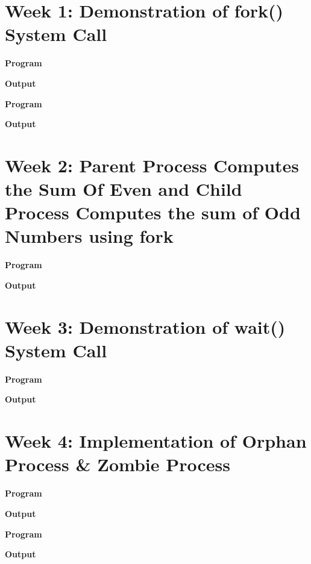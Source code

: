 \documentclass{article}
\begin{document}
\tableofcontents

\newpage

\section{Week 1: Demonstration of fork() System Call}

\noindent \textbf{\large{Program}}


\newpage
\noindent \textbf{\large{Output}}


\newpage
\noindent \textbf{\large{Program}}


\newpage
\noindent \textbf{\large{Output}}


\newpage
\section{Week 2: Parent Process Computes the Sum Of Even and Child Process Computes the sum of Odd Numbers using fork}

\noindent \textbf{\large{Program}}


\newpage
\noindent \textbf{\large{Output}}


\newpage
\section{Week 3: Demonstration of wait() System Call}

\noindent \textbf{\large{Program}}


\newpage
\noindent \textbf{\large{Output}}


\newpage
\section{Week 4: Implementation of Orphan Process \& Zombie Process}

\noindent \textbf{\large{Program}}


\newpage
\noindent \textbf{\large{Output}}


\newpage
\noindent \textbf{\large{Program}}


\newpage
\noindent \textbf{\large{Output}}

\end{document}
